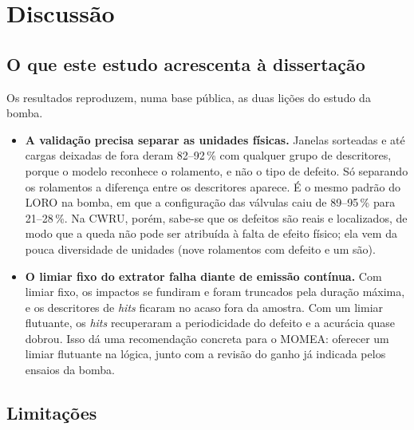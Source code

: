 \documentclass[12pt]{article}
\begin{document}
\section{Discussão}
\label{sec:discussao}

\subsection{O que este estudo acrescenta à dissertação}

Os resultados reproduzem, numa base pública, as duas lições do estudo da bomba.
\begin{itemize}
	\item \textbf{A validação precisa separar as unidades físicas.} Janelas sorteadas e até cargas deixadas de fora deram 82--92\,\% com qualquer grupo de descritores, porque o modelo reconhece o rolamento, e não o tipo de defeito. Só separando os rolamentos a diferença entre os descritores aparece. É o mesmo padrão do LORO na bomba, em que a configuração das válvulas caiu de 89--95\,\% para 21--28\,\%. Na CWRU, porém, sabe-se que os defeitos são reais e localizados, de modo que a queda não pode ser atribuída à falta de efeito físico; ela vem da pouca diversidade de unidades (nove rolamentos com defeito e um são).
	\item \textbf{O limiar fixo do extrator falha diante de emissão contínua.} Com limiar fixo, os impactos se fundiram e foram truncados pela duração máxima, e os descritores de \textit{hits} ficaram no acaso fora da amostra. Com um limiar flutuante, os \textit{hits} recuperaram a periodicidade do defeito e a acurácia quase dobrou. Isso dá uma recomendação concreta para o MOMEA: oferecer um limiar flutuante na lógica, junto com a revisão do ganho já indicada pelos ensaios da bomba.
\end{itemize}

\subsection{Limitações}
\end{document}

